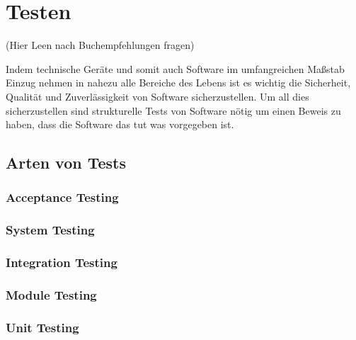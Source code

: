 \section*{Testen}

(Hier Leen nach Buchempfehlungen fragen)

Indem technische Geräte und somit auch Software im umfangreichen Maßstab Einzug nehmen in nahezu alle Bereiche des
Lebens ist es wichtig die Sicherheit, Qualität und Zuverlässigkeit von Software sicherzustellen.
Um all dies sicherzustellen sind strukturelle Tests von Software nötig um einen Beweis zu haben, dass die Software
das tut was vorgegeben ist.

\subsection*{ Arten von Tests }

\subsubsection*{Acceptance Testing}

\subsubsection*{System Testing}

\subsubsection*{Integration Testing}

\subsubsection*{Module Testing}

\subsubsection*{Unit Testing}
